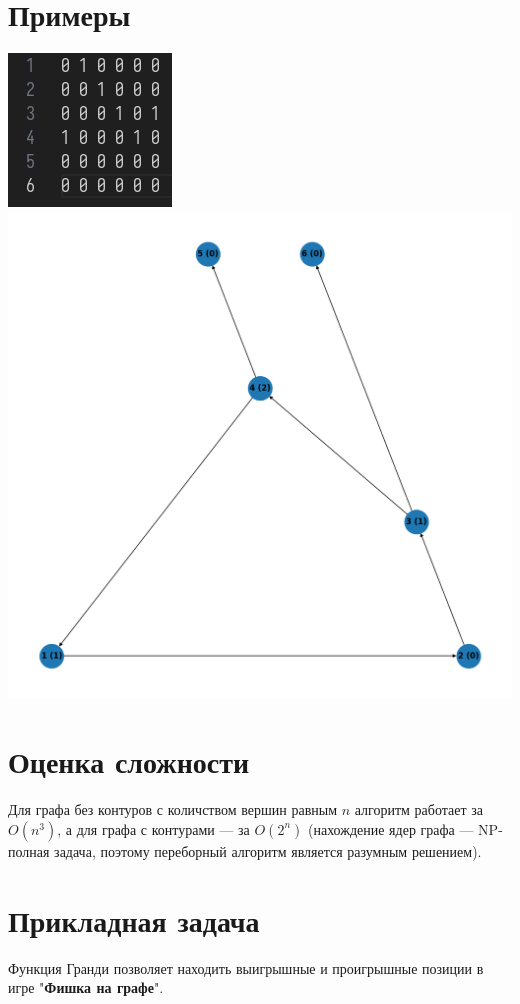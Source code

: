 \documentclass[12pt, letterpaper, titlepage]{article}
\begin{document}
\section{Примеры}
\includegraphics[scale=0.7]{graphs/adj_matrix.png}
\includegraphics[scale=0.5]{graphs/grundy.png}
\section{Оценка сложности}
Для графа без контуров с количством вершин равным $n$ алгоритм работает за $O(n^3)$,
а для графа с контурами --- за $O(2^n)$ (нахождение ядер графа --- NP-полная задача, поэтому переборный алгоритм является разумным решением).
\section{Прикладная задача}
Функция Гранди позволяет находить выигрышные и проигрышные позиции в игре "\textbf{Фишка на графе}".
\end{document}
